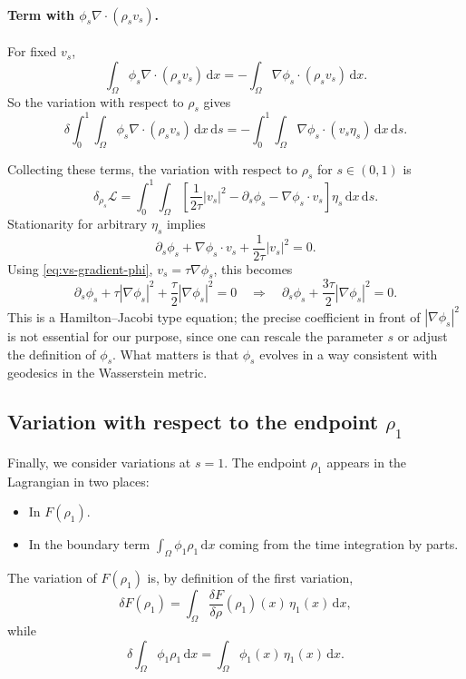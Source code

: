 \documentclass[11pt]{article}
\numberwithin{equation}{section}
\theoremstyle{definition}
\newcommand{\dd}{\,\mathrm{d}}
\begin{document}
\paragraph{Term with $\phi_s \nabla\cdot(\rho_s v_s)$.}
For fixed $v_s$,
\[
\int_{\Omega} \phi_s \nabla\cdot(\rho_s v_s)\dd x
= -\int_{\Omega} \nabla\phi_s\cdot(\rho_s v_s)\dd x.
\]
So the variation with respect to $\rho_s$ gives
\[
\delta \int_0^1\!\!\int_{\Omega} \phi_s \nabla\cdot(\rho_s v_s)\dd x\dd s
= -\int_0^1\!\!\int_{\Omega} \nabla\phi_s\cdot(v_s \eta_s)\dd x\dd s.
\]

\medskip

Collecting these terms, the variation with respect to $\rho_s$ for $s\in(0,1)$ is
\[
\delta_{\rho_s} \mathcal{L}
= \int_0^1\!\!\int_{\Omega}
\left[
\frac{1}{2\tau}|v_s|^2
- \partial_s\phi_s
- \nabla\phi_s\cdot v_s
\right]\eta_s\dd x\dd s.
\]
Stationarity for arbitrary $\eta_s$ implies
\begin{equation}
\label{eq:HJ-phi}
\partial_s\phi_s + \nabla\phi_s\cdot v_s + \frac{1}{2\tau}|v_s|^2 = 0.
\end{equation}
Using \eqref{eq:vs-gradient-phi}, $v_s = \tau \nabla\phi_s$, this becomes
\[
\partial_s\phi_s + \tau|\nabla\phi_s|^2 + \frac{\tau}{2}|\nabla\phi_s|^2 = 0
\quad\Longrightarrow\quad
\partial_s\phi_s + \frac{3\tau}{2}|\nabla\phi_s|^2 = 0.
\]
This is a Hamilton--Jacobi type equation; the precise coefficient in front of $|\nabla\phi_s|^2$ is not essential for our purpose, since one can rescale the parameter $s$ or adjust the definition of $\phi_s$. What matters is that $\phi_s$ evolves in a way consistent with geodesics in the Wasserstein metric.

\subsection{Variation with respect to the endpoint $\rho_1$}

Finally, we consider variations at $s=1$. The endpoint $\rho_1$ appears in the Lagrangian in two places:
\begin{itemize}
\item In $F(\rho_1)$.
\item In the boundary term $\int_{\Omega}\phi_1 \rho_1\dd x$ coming from the time integration by parts.
\end{itemize}
The variation of $F(\rho_1)$ is, by definition of the first variation,
\[
\delta F(\rho_1)
= \int_{\Omega} \frac{\delta F}{\delta \rho}(\rho_1)(x)\,\eta_1(x)\dd x,
\]
while
\[
\delta \int_{\Omega} \phi_1 \rho_1\dd x
= \int_{\Omega} \phi_1(x)\,\eta_1(x)\dd x.
\]
\end{document}
